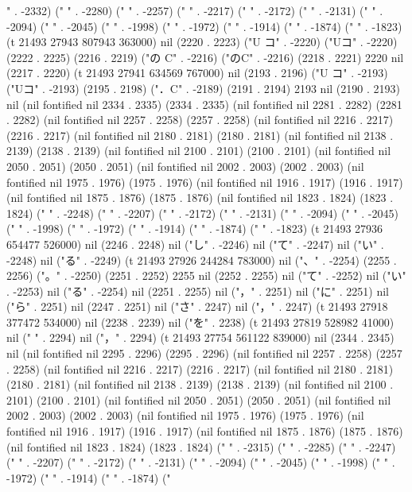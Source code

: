 " . -2332) ("
" . -2280) ("
" . -2257) ("
" . -2217) ("
" . -2172) ("
" . -2131) ("
" . -2094) ("
" . -2045) ("
" . -1998) ("
" . -1972) ("
" . -1914) ("
" . -1874) ("
" . -1823) (t 21493 27943 807943 363000) nil (2220 . 2223) ("U コ" . -2220) ("Uコ" . -2220) (2222 . 2225) (2216 . 2219) ("の C" . -2216) ("のC" . -2216) (2218 . 2221) 2220 nil (2217 . 2220) (t 21493 27941 634569 767000) nil (2193 . 2196) ("U コ" . -2193) ("Uコ" . -2193) (2195 . 2198) ("．C" . -2189) (2191 . 2194) 2193 nil (2190 . 2193) nil (nil fontified nil 2334 . 2335) (2334 . 2335) (nil fontified nil 2281 . 2282) (2281 . 2282) (nil fontified nil 2257 . 2258) (2257 . 2258) (nil fontified nil 2216 . 2217) (2216 . 2217) (nil fontified nil 2180 . 2181) (2180 . 2181) (nil fontified nil 2138 . 2139) (2138 . 2139) (nil fontified nil 2100 . 2101) (2100 . 2101) (nil fontified nil 2050 . 2051) (2050 . 2051) (nil fontified nil 2002 . 2003) (2002 . 2003) (nil fontified nil 1975 . 1976) (1975 . 1976) (nil fontified nil 1916 . 1917) (1916 . 1917) (nil fontified nil 1875 . 1876) (1875 . 1876) (nil fontified nil 1823 . 1824) (1823 . 1824) ("
" . -2248) ("
" . -2207) ("
" . -2172) ("
" . -2131) ("
" . -2094) ("
" . -2045) ("
" . -1998) ("
" . -1972) ("
" . -1914) ("
" . -1874) ("
" . -1823) (t 21493 27936 654477 526000) nil (2246 . 2248) nil ("し" . -2246) nil ("て" . -2247) nil ("い" . -2248) nil ("る" . -2249) (t 21493 27926 244284 783000) nil ("、" . -2254) (2255 . 2256) ("。" . -2250) (2251 . 2252) 2255 nil (2252 . 2255) nil ("て" . -2252) nil ("い" . -2253) nil ("る" . -2254) nil (2251 . 2255) nil ("，" . 2251) nil ("に" . 2251) nil ("ら" . 2251) nil (2247 . 2251) nil ("さ" . 2247) nil ("，" . 2247) (t 21493 27918 377472 534000) nil (2238 . 2239) nil ("を" . 2238) (t 21493 27819 528982 41000) nil ("
" . 2294) nil ("，" . 2294) (t 21493 27754 561122 839000) nil (2344 . 2345) nil (nil fontified nil 2295 . 2296) (2295 . 2296) (nil fontified nil 2257 . 2258) (2257 . 2258) (nil fontified nil 2216 . 2217) (2216 . 2217) (nil fontified nil 2180 . 2181) (2180 . 2181) (nil fontified nil 2138 . 2139) (2138 . 2139) (nil fontified nil 2100 . 2101) (2100 . 2101) (nil fontified nil 2050 . 2051) (2050 . 2051) (nil fontified nil 2002 . 2003) (2002 . 2003) (nil fontified nil 1975 . 1976) (1975 . 1976) (nil fontified nil 1916 . 1917) (1916 . 1917) (nil fontified nil 1875 . 1876) (1875 . 1876) (nil fontified nil 1823 . 1824) (1823 . 1824) ("
" . -2315) ("
" . -2285) ("
" . -2247) ("
" . -2207) ("
" . -2172) ("
" . -2131) ("
" . -2094) ("
" . -2045) ("
" . -1998) ("
" . -1972) ("
" . -1914) ("
" . -1874) ("
